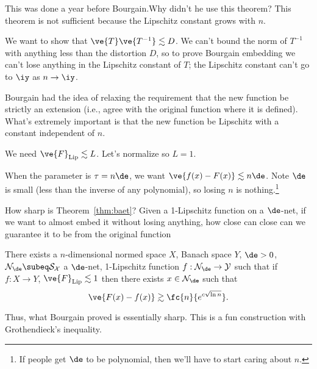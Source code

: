 This was done a year before Bourgain.Why didn't he use this theorem? This theorem is not sufficient because the Lipschitz constant grows with $n$.

We want to show that $\ve{T}\ve{T^{-1}}\lesssim D$. We can't bound the norm of $T^{-1}$ with anything less than the distortion $D$, so to prove Bourgain embedding we can't lose anything in the Lipschitz constant of $T$; the Lipschitz constant can't go to $\iy$ as $n\to \iy$. 

Bourgain had the idea of relaxing the requirement that the new function be strictly an extension (i.e., agree with the original function where it is defined). What's extremely important  is that the new function be Lipschitz with a constant independent of $n$.
 
We need $\ve{F}_{\text{Lip}}\lesssim L$. 
Let's normalize so $L=1$. 

When the parameter is $\tau=n\de$, we want $\ve{f(x)-F(x)}\lesssim n\de$. Note $\de$ is small (less than the inverse of any polynomial), so losing $n$ is nothing.\footnote{If people get $\de$ to be polynomial, then we'll have to start caring about $n$.}

How sharp is Theorem~\ref{thm:baet}? Given a 1-Lipschitz function on a $\de$-net, if we want to almost embed it without losing anything, how close can close can we guarantee it to  be from the original function
\begin{thm}
There exists a $n$-dimensional normed space $X$, Banach space $Y$, $\de>0$, $\cal N_\de\subeq S_X$ a $\de$-net, 1-Lipschitz function $f:\cal N_\de\to Y$ such that if $f:X\to Y$, $\ve{F}_{\text{Lip}}\lesssim 1$ then there exists $x\in \cal N_\de$ such that 
\[
\ve{F(x)-f(x)}\gtrsim \fc{n}{e^{c\sqrt{\ln n}}}.
\]
\end{thm}
Thus, what Bourgain proved is essentially sharp.
This is a fun construction with Grothendieck's inequality.


